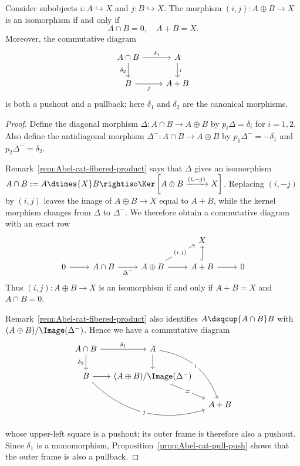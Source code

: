 \begin{proposition}\label{prop:biproduct-sum-intersection}
	Consider subobjects $i:A\hookrightarrow X$ and $j:B\hookrightarrow X$.
	The morphism $(i,j):A\oplus B\to X$ is an isomorphism if and only if
	\[ A \cap B = 0, \quad A + B = X. \]
	Moreover, the commutative diagram
	\[\begin{tikzcd}
		A \cap B \arrow[r, "\delta_1"] \arrow[d, "\delta_2"'] & A \arrow[d, "i"] \\
		B \arrow[r, "j"'] & A + B
	\end{tikzcd}\]
	is both a pushout and a pullback; here $\delta_1$ and $\delta_2$ are the
	canonical morphisms.
\end{proposition}
\begin{proof}
	Define the diagonal morphism $\Delta:A\cap B\to A\oplus B$ by
	$p_i\Delta=\delta_i$ for $i=1,2$. Also define the antidiagonal morphism
	$\Delta^-:A\cap B\to A\oplus B$ by
	$p_1\Delta^-=-\delta_1$ and $p_2\Delta^-=\delta_2$.

	Remark~\ref{rem:Abel-cat-fibered-product} says that $\Delta$ gives an
	isomorphism
	$A\cap B:=A\dtimes{X}B\rightiso
	\Ker\left[A\oplus B\xrightarrow{(i,-j)}X\right]$. Replacing $(i,-j)$ by $(i,j)$
	leaves the image of $A\oplus B\to X$ equal to $A+B$, while the kernel
	morphism changes from $\Delta$ to $\Delta^-$. We therefore obtain a
	commutative diagram with an exact row
	\[\begin{tikzcd}
		& & & X & \\
		0 \arrow[r] & A \cap B \arrow[r, "{\Delta^-}"'] & A \oplus B \arrow[ru, "{(i, j)}" description] \arrow[r] & A+B \arrow[r] \arrow[hookrightarrow, u] & 0
	\end{tikzcd}\]
	Thus $(i,j):A\oplus B\to X$ is an isomorphism if and only if $A+B=X$
	and $A\cap B=0$.

	Remark~\ref{rem:Abel-cat-fibered-product} also identifies
	$A\dsqcup{A\cap B}B$ with $(A\oplus B)/\Image(\Delta^-)$. Hence we have a
	commutative diagram
	\[\begin{tikzcd}[column sep=small]
		A \cap B \arrow[r, "\delta_1"] \arrow[d, "\delta_2"'] & A \arrow[d] \arrow[rdd, bend left, "i" description] & \\
		B \arrow[r] \arrow[rrd, bend right, "j" description] & (A \oplus B)/\Image(\Delta^-) \arrow[rd, "\simeq" description] & \\
		& & A + B
	\end{tikzcd}\]
	whose upper-left square is a pushout; its outer frame is therefore also a
	pushout. Since $\delta_1$ is a monomorphism,
	Proposition~\ref{prop:Abel-cat-pull-push} shows that the outer frame is also
	a pullback.
\end{proof}

